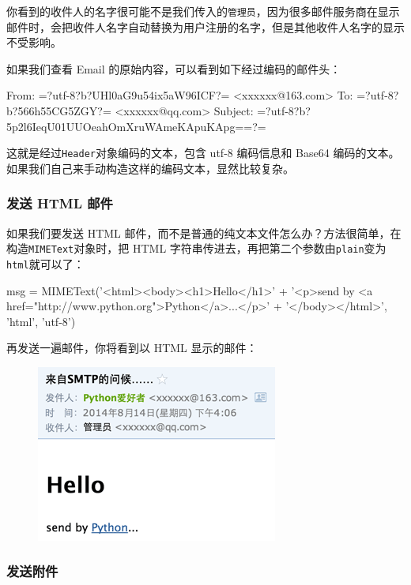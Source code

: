 你看到的收件人的名字很可能不是我们传入的\texttt{管理员}，因为很多邮件服务商在显示邮件时，会把收件人名字自动替换为用户注册的名字，但是其他收件人名字的显示不受影响。

如果我们查看 Email 的原始内容，可以看到如下经过编码的邮件头：

\begin{pythoncode}
From: =?utf-8?b?UHl0aG9u54ix5aW96ICF?= <xxxxxx@163.com>
To: =?utf-8?b?566h55CG5ZGY?= <xxxxxx@qq.com>
Subject: =?utf-8?b?5p2l6IeqU01UUOeahOmXruWAmeKApuKApg==?=
\end{pythoncode}

这就是经过\texttt{Header}对象编码的文本，包含 utf-8 编码信息和 Base64
编码的文本。如果我们自己来手动构造这样的编码文本，显然比较复杂。

\hypertarget{ux53d1ux9001-html-ux90aeux4ef6}{%
\subsubsection{发送 HTML 邮件}\label{ux53d1ux9001-html-ux90aeux4ef6}}

如果我们要发送 HTML
邮件，而不是普通的纯文本文件怎么办？方法很简单，在构造\texttt{MIMEText}对象时，把
HTML
字符串传进去，再把第二个参数由\texttt{plain}变为\texttt{html}就可以了：

\begin{pythoncode}
msg = MIMEText('<html><body><h1>Hello</h1>' +
    '<p>send by <a href="http://www.python.org">Python</a>...</p>' +
    '</body></html>', 'html', 'utf-8')
\end{pythoncode}

再发送一遍邮件，你将看到以 HTML 显示的邮件：

 
 \begin{figure}[htp]
	\centering
	\includegraphics[width=0.6\linewidth]{fig/967455607327072.png}
\end{figure}


\hypertarget{ux53d1ux9001ux9644ux4ef6}{%
\subsubsection{发送附件}\label{ux53d1ux9001ux9644ux4ef6}}

